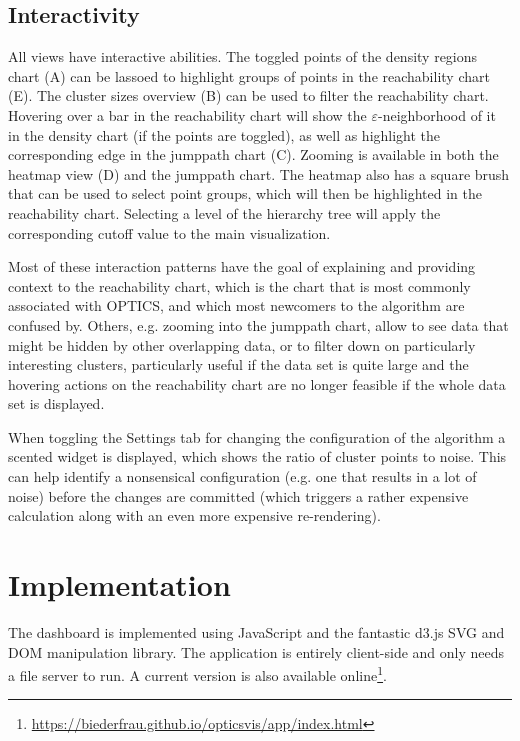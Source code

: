 \documentclass{vgtc} %
\begin{document}
\subsection{Interactivity}

All views have interactive abilities. The toggled points of the density regions
chart (A) can be lassoed to highlight groups of points in the reachability
chart (E).  The cluster sizes overview (B) can be used to filter the
reachability chart. Hovering over a bar in the reachability chart will show the
$\varepsilon$-neighborhood of it in the density chart (if the points are
toggled), as well as highlight the corresponding edge in the jumppath chart
(C). Zooming is available in both the heatmap view (D) and the jumppath chart.
The heatmap also has a square brush that can be used to select point groups,
which will then be highlighted in the reachability chart. Selecting a level of the
hierarchy tree will apply the corresponding cutoff value to the main visualization.

Most of these interaction patterns have the goal of explaining and providing
context to the reachability chart, which is the chart that is most commonly
associated with OPTICS, and which most newcomers to the algorithm are confused
by. Others, e.g. zooming into the jumppath chart, allow to see data that might
be hidden by other overlapping data, or to filter down on particularly
interesting clusters, particularly useful if the data set is quite large and
the hovering actions on the reachability chart are no longer feasible if the
whole data set is displayed.

When toggling the Settings tab for changing the configuration of the algorithm
a scented widget is displayed, which shows the ratio of cluster points to
noise.  This can help identify a nonsensical configuration (e.g. one that
results in a lot of noise) before the changes are committed (which triggers a
rather expensive calculation along with an even more expensive re-rendering).

\section{Implementation} %

The dashboard is implemented using JavaScript and the fantastic d3.js SVG and DOM
manipulation library. The application is entirely client-side and only needs a
file server to run. A current version is also available
online\footnote{\url{https://biederfrau.github.io/opticsvis/app/index.html}}.
\end{document}
